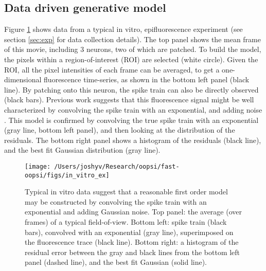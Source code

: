 \subsection{Data driven generative model} \label{sec:model}

Figure \ref{fig:in_vitro_ex} shows data from a typical in vitro, epifluorescence experiment (see section \ref{sec:exp} for data collection details).  The top panel shows the mean frame of this movie, including 3 neurons, two of which are patched.  To build the model, the pixels within a region-of-interest (ROI) are selected (white circle).  Given the ROI, all the pixel intensities of each frame can be averaged, to get a one-dimensional fluorescence time-series, as shown in the bottom left panel (black line).  By patching onto this neuron, the spike train can also be directly observed (black bars). Previous work suggests that this fluorescence signal might be well characterized by convolving the spike train with an exponential, and adding noise \cite{ImagingManual}.  This model is confirmed by convolving the true spike train with an exponential (gray line, bottom left panel), and then looking at the distribution of the residuals.  The bottom right panel shows a histogram of the residuals (black line), and the best fit Gaussian distribution (gray line).


\begin{figure}[h!]
\centering \texttt{[image: /Users/joshyv/Research/oopsi/fast-oopsi/figs/in\_vitro\_ex]}
\caption[data-based model]{Typical in vitro data suggest that a reasonable first order model may be constructed by convolving the spike train with an exponential and adding Gaussian noise. Top panel: the average (over frames) of a typical field-of-view.  Bottom left: spike train (black bars), convolved with an exponential (gray line), superimposed on the fluorescence trace (black line).  Bottom right: a histogram of the residual error between the gray and black lines from the bottom left panel (dashed line), and the best fit Gaussian (solid line).} \label{fig:in_vitro_ex}
\end{figure}

